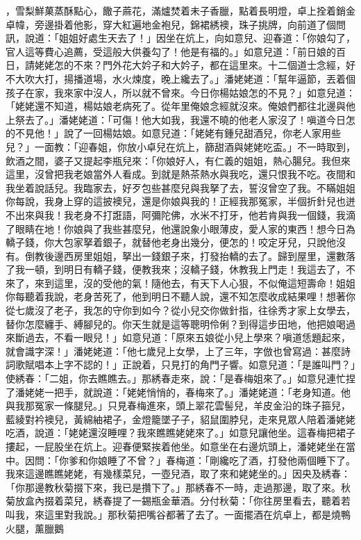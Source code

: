 \begin{showcontents}{}
，雪梨鮮菓蒸酥點心，饊子蔴花，滿爐焚着未子香臘，點着長明燈，卓上拴着銷金卓幃，旁邊掛着他影，穿大紅遍地金袍兒，錦裙綉襖，珠子挑牌，向前道了個問訊，說道：「姐姐好處生天去了！」因坐在炕上，向如意兒、迎春道：「你娘勾了，官人這等費心追薦，受這般大供養勾了！他是有福的。」如意兒道：「前日娘的百日，請姥姥怎的不來？門外花大妗子和大妗子，都在這里來。十二個道士念經，好不大吹大打，揚播道場，水火煉度，晚上纔去了。」潘姥姥道：「幫年逼節，丟着個孩子在家，我來家中沒人，所以就不曾來。今日你楊姑娘怎的不見？」如意兒道：「姥姥還不知道，楊姑娘老病死了。從年里俺娘念經就沒來。俺娘們都往北邊與他上祭去了。」潘姥姥道：「可傷！他大如我，我還不曉的他老人家沒了！嗔道今日怎的不見他！」說了一回楊姑娘。如意兒道：「姥姥有鍾兒甜酒兒，你老人家用些兒？」一面教：「迎春姐，你放小卓兒在炕上，篩甜酒與姥姥吃盃。」不一時取到，飲酒之間，婆子又提起李瓶兒來：「你娘好人，有仁義的姐姐，熱心腸兒。我但來這里，沒曾把我老娘當外人看成。到就是熱茶熱水與我吃，還只恨我不吃。夜間和我坐着說話兒。我臨家去，好歹包些甚麼兒與我拏了去，誓沒曾空了我。不瞞姐姐你每說，我身上穿的這披襖兒，還是你娘與我的！正經我那冤家，半個折針兒也迸不出來與我！我老身不打誑語，阿彌陀佛，水米不打牙，他若肯與我一個錢，我滴了眼睛在地！你娘與了我些甚麼兒，他還說象小眼薄皮，愛人家的東西！想今日為轎子錢，你大包家拏着銀子，就替他老身出幾分，便怎的！咬定牙兒，只說他沒有。倒教後邊西房里姐姐，拏出一錢銀子來，打發抬轎的去了。歸到屋里，還數落了我一頓，到明日有轎子錢，便教我來；沒轎子錢，休教我上門走！我這去了，不來了，來到這里，沒的受他的氣！隨他去，有天下人心狠，不似俺這短壽命！姐姐你每聽着我說，老身苦死了，他到明日不聽人說，還不知怎麼收成結果哩！想著你從七歲沒了老子，我怎的守你到如今？從小兒交你做針指，往徐秀才家上女學去，替你怎麼纏手、縛腳兒的。你天生就是這等聰明伶俐？到得這步田地，他把娘喝過來斷過去，不看一眼兒！」如意兒道：「原來五娘從小兒上學來？嗔道恁題起來，就會識字深！」潘姥姥道：「他七歲兒上女學，上了三年，字倣也曾寫過：甚麼詩詞歌賦唱本上字不認的！」正說着，只見打的角門子響。如意兒道：「是誰叫門？」使綉春：「二姐，你去瞧瞧去。」那綉春走來，說：「是春梅姐來了。」如意兒連忙捏了潘姥姥一把手，就說道：「姥姥悄悄的，春梅來了。」潘姥姥道：「老身知道。他與我那冤家一條腿兒。」只見春梅進來，頭上翠花雲髻兒，羊皮金沿的珠子箍兒，藍綾對衿襖兒，黃綿紬裙子，金燈籠墜子子，貂鼠圍脖兒，走來見眾人陪着潘姥姥吃酒，說道：「姥姥還沒睡哩？我來瞧瞧姥姥來了。」如意兒讓他坐。這春梅把裙子摟起，一屁股坐在炕上。迎春便緊挨着他坐。如意坐在右邊炕頭上，潘姥姥坐在當中。因問：「你爹和你娘睡了不曾？」春梅道：「剛纔吃了酒，打發他兩個睡下了。我來這邊瞧瞧姥姥，有幾樣菜兒，一壺兒酒，取了來和姥姥坐的。」因央及綉春：「你那邊教秋菊掇下來，我已是攢下了。」那綉春不一時，走過那邊，取了來。秋菊放盒內掇着菜兒，綉春提了一錫瓶金華酒。分付秋菊：「你往房里看去，聽着若叫我，來這里對我說。」那秋菊把嘴谷都著了去了。一面擺酒在炕卓上，都是燒鴨 火腿，薰臘鵝 
\end{showcontents}
